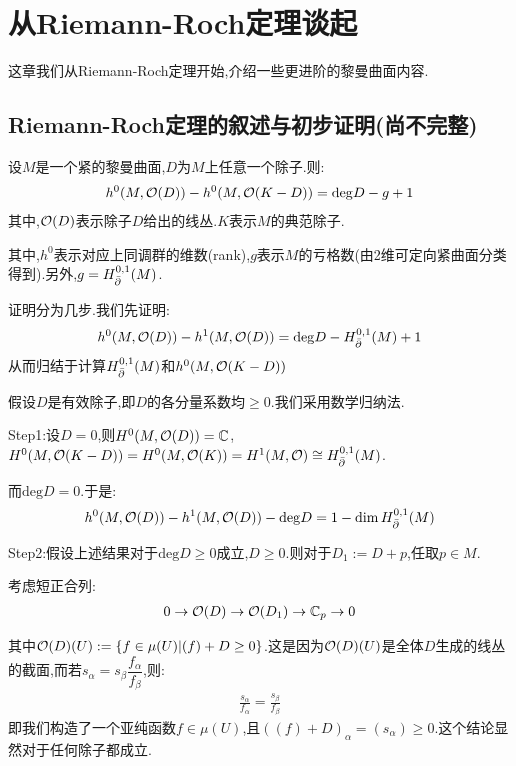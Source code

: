 \ifx\allfiles\undefined

\else
\fi
\chapter{从Riemann-Roch定理谈起}
这章我们从Riemann-Roch定理开始,介绍一些更进阶的黎曼曲面内容.
\section{Riemann-Roch定理的叙述与初步证明(尚不完整)}
\begin{theorem}
	设$M$是一个紧的黎曼曲面,$D$为$M$上任意一个除子.则:
	\begin{align*}
		h^0(M,\mathcal{O}(D))-h^0(M,\mathcal{O}(K-D))=\mathrm{deg}D-g+1
	\end{align*}
    其中,$\mathcal{O}(D)$表示除子$D$给出的线丛.$K$表示$M$的典范除子.

	其中,$h^0$表示对应上同调群的维数(rank),$g$表示$M$的亏格数(由2维可定向紧曲面分类得到).另外,$g=H^{0,1}_{\bar{\partial}}(M)$.
\end{theorem}

证明分为几步.我们先证明:
\begin{align*}
		h^0(M,\mathcal{O}(D))-h^1(M,\mathcal{O}(D))=\mathrm{deg}D-H^{0,1}_{\bar{\partial}}(M)+1
	\end{align*}
从而归结于计算$H^{0,1}_{\bar{\partial}}(M)$和$h^0(M,\mathcal{O}(K-D))$

假设$D$是有效除子,即$D$的各分量系数均$\geq 0$.我们采用数学归纳法.

Step1:设$D=0$,则$H^0(M,\mathcal{O}(D))=\mathbb{C}$,$H^0(M,\mathcal{O}(K-D))=H^0(M,\mathcal{O}(K))=H^1(M,\mathcal{O})\cong H_{\bar{\partial}}^{0,1}(M)$.

而$\mathrm{deg}D=0$.于是:
\begin{align*}
	h^0(M,\mathcal{O}(D))-h^1(M,\mathcal{O}(D))-\mathrm{deg}D=1-\dim H_{\bar{\partial}}^{0,1}(M)
\end{align*}

Step2:假设上述结果对于$\mathrm{deg}D\geq 0$成立,$D\geq 0$.则对于$D_1:=D+p$,任取$p \in M$.

考虑短正合列:
\begin{align*}
	0 \to \mathcal{O}(D) \to \mathcal{O}(D_1) \to \mathbb{C}_p \to 0
\end{align*}

其中$\mathcal{O}(D)(U):=\{ f\in \mu(U)|(f)+D\geq 0\}$.这是因为$\mathcal{O}(D)(U)$是全体$D$生成的线丛的截面,而若$s_\alpha=s_\beta \dfrac{f_{\alpha}}{f_\beta}$,则:
\begin{align*}
	\frac{s_\alpha}{f_\alpha}=\frac{s_\beta}{f_\beta}
\end{align*}
即我们构造了一个亚纯函数$f \in \mu(U)$,且$((f)+D)_\alpha=(s_\alpha)\geq 0$.这个结论显然对于任何除子都成立.

